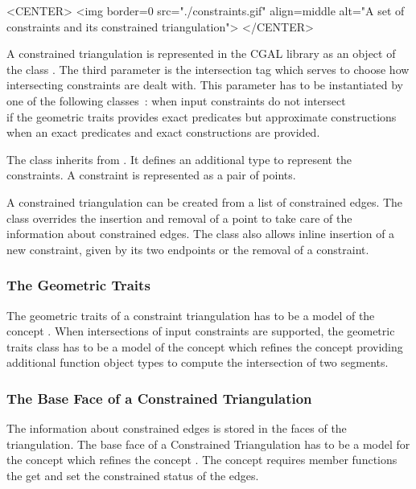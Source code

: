 \begin{ccHtmlOnly}
<CENTER>
<img border=0 src="./constraints.gif" align=middle alt="A set of
constraints and its constrained triangulation">
</CENTER>
\end{ccHtmlOnly}

A constrained triangulation is represented in the CGAL library as an
object of the class .
The third parameter  is the intersection tag
which serves to choose how intersecting constraints
are dealt with. This parameter has to be instantiated
by one of the following classes~:
 when input constraints do not
intersect \\
 if the geometric traits provides
exact predicates but approximate constructions \\
 when an exact predicates
and exact constructions are provided.

The class 
inherits from .
It defines an additional type 
to represent the constraints. A
constraint is represented as a pair of points.

A  constrained triangulation can be created
from a
list of constrained edges.
The class 
overrides the insertion and removal of a point to take care of the
information about constrained edges. The class also allows inline
insertion of a new constraint, given by its two endpoints
or the removal of a constraint.

\subsubsection{The Geometric Traits}
The geometric traits of a constraint triangulation
 has to be a model
of the concept .
When intersections of input constraints are supported, 
the geometric traits class has to be a model 
of the concept 
which refines the concept 
providing  additional function object types
to compute the intersection of two segments.

\subsubsection{The Base Face of a Constrained Triangulation}
 The information about constrained edges is stored in the 
faces of the triangulation. The base face of a Constrained Triangulation
has to be a model for the concept 
which refines the concept .
The concept 
requires  member functions
 the get and set the constrained status of the edges.

